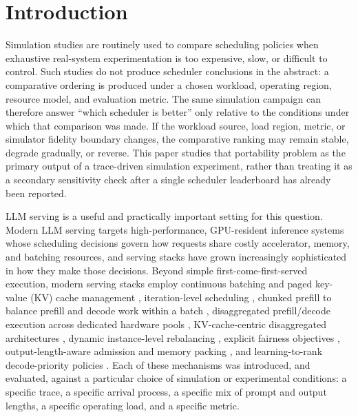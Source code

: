 \section{Introduction}
\label{sec:introduction}

Simulation studies are routinely used to compare scheduling policies when
exhaustive real-system experimentation is too expensive, slow, or difficult
to control. Such studies do not produce scheduler conclusions in the
abstract: a comparative ordering is produced under a chosen workload,
operating region, resource model, and evaluation metric. The same simulation
campaign can therefore answer ``which scheduler is better'' only relative to
the conditions under which that comparison was made. If the workload source,
load region, metric, or simulator fidelity boundary changes, the comparative
ranking may remain stable, degrade gradually, or reverse. This paper studies
that portability problem as the primary output of a trace-driven simulation
experiment, rather than treating it as a secondary sensitivity check after a
single scheduler leaderboard has already been reported.

LLM serving is a useful and practically important setting for this question.
Modern LLM serving targets high-performance, GPU-resident inference systems
whose scheduling decisions govern how requests share costly accelerator,
memory, and batching resources, and serving stacks have grown increasingly
sophisticated in how they make those decisions. Beyond simple
first-come-first-served execution, modern serving stacks employ continuous
batching and paged key-value (KV) cache management
\citep{kwon2023vllm}, iteration-level scheduling \citep{yu2022orca}, chunked
prefill to balance prefill and decode work within a batch
\citep{agrawal2024sarathi}, disaggregated prefill/decode execution across
dedicated hardware pools \citep{zhong2024distserve,patel2024splitwise},
KV-cache-centric disaggregated architectures \citep{qin2025mooncake},
dynamic instance-level rebalancing \citep{sun2024llumnix}, explicit
fairness objectives \citep{sheng2024vtc}, output-length-aware admission and
memory packing \citep{jin2023s3}, and learning-to-rank decode-priority
policies \citep{efficientllmscheduling2024}. Each of these mechanisms was
introduced, and evaluated, against a particular choice of simulation or
experimental conditions: a specific trace, a specific arrival process, a
specific mix of prompt and output lengths, a specific operating load, and a
specific metric.

